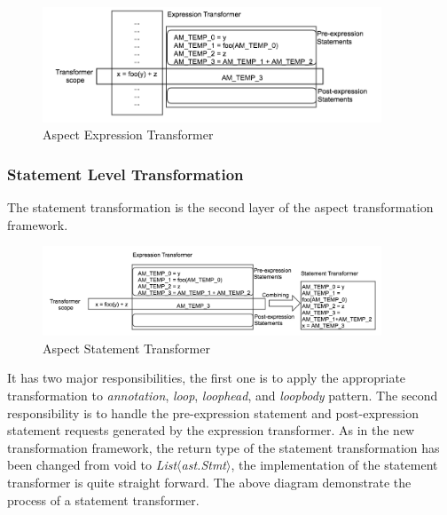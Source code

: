 \documentclass{comp621}
\begin{document}
\begin{figure}[!htbp]
    \begin{center}
    \includegraphics[width=0.9\textwidth]{figures/aspect_expr_transform}
    \end{center}
    \caption{Aspect Expression Transformer}
\end{figure}

\subsubsection{Statement Level Transformation}
The statement transformation is the second layer of the aspect transformation
framework. 
\begin{figure}[!htbp]
    \begin{center}
    \includegraphics[width=0.9\textwidth]{figures/aspect_statement_transform}
    \end{center}
    \caption{Aspect Statement Transformer}
\end{figure}
It has two major responsibilities, the first one is to apply the
appropriate transformation to \emph{annotation}, \emph{loop}, \emph{loophead},
and \emph{loopbody} pattern. The second responsibility is to handle the
pre-expression statement and post-expression statement requests generated by
the expression transformer. As in the new transformation framework, the return
type of the statement transformation has been changed from void to
\emph{List$\langle$ast.Stmt$\rangle$}, the implementation of the statement
transformer is quite straight forward. The above diagram demonstrate the
process of a statement transformer.
\end{document}
